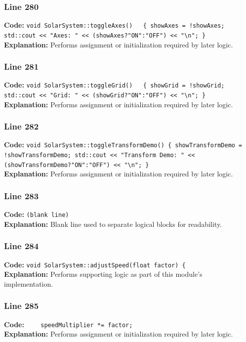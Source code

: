 \documentclass[11pt,a4paper]{article}
\begin{document}
\subsubsection*{Line 280}
\textbf{Code:} \verb|void SolarSystem::toggleAxes()   { showAxes = !showAxes; std::cout << "Axes: " << (showAxes?"ON":"OFF") << "\n"; }|\\
\textbf{Explanation:} Performs assignment or initialization required by later logic.

\subsubsection*{Line 281}
\textbf{Code:} \verb|void SolarSystem::toggleGrid()   { showGrid = !showGrid; std::cout << "Grid: " << (showGrid?"ON":"OFF") << "\n"; }|\\
\textbf{Explanation:} Performs assignment or initialization required by later logic.

\subsubsection*{Line 282}
\textbf{Code:} \verb|void SolarSystem::toggleTransformDemo() { showTransformDemo = !showTransformDemo; std::cout << "Transform Demo: " << (showTransformDemo?"ON":"OFF") << "\n"; }|\\
\textbf{Explanation:} Performs assignment or initialization required by later logic.

\subsubsection*{Line 283}
\textbf{Code:} \texttt{(blank line)}\\
\textbf{Explanation:} Blank line used to separate logical blocks for readability.

\subsubsection*{Line 284}
\textbf{Code:} \verb|void SolarSystem::adjustSpeed(float factor) {|\\
\textbf{Explanation:} Performs supporting logic as part of this module's implementation.

\subsubsection*{Line 285}
\textbf{Code:} \verb|    speedMultiplier *= factor;|\\
\textbf{Explanation:} Performs assignment or initialization required by later logic.
\end{document}
